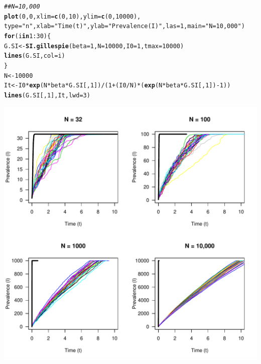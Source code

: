 \documentclass[12pt]{article}\usepackage[]{graphicx}\usepackage[]{color}
\makeatletter
\def\maxwidth{ %
  \ifdim\Gin@nat@width>\linewidth
    \linewidth
  \else
    \Gin@nat@width
  \fi
}
\newcommand{\hlnum}[1]{\textcolor[rgb]{0.686,0.059,0.569}{#1}}%
\newcommand{\hlstr}[1]{\textcolor[rgb]{0.192,0.494,0.8}{#1}}%
\newcommand{\hlcom}[1]{\textcolor[rgb]{0.678,0.584,0.686}{\textit{#1}}}%
\newcommand{\hlopt}[1]{\textcolor[rgb]{0,0,0}{#1}}%
\newcommand{\hlstd}[1]{\textcolor[rgb]{0.345,0.345,0.345}{#1}}%
\newcommand{\hlkwa}[1]{\textcolor[rgb]{0.161,0.373,0.58}{\textbf{#1}}}%
\newcommand{\hlkwb}[1]{\textcolor[rgb]{0.69,0.353,0.396}{#1}}%
\newcommand{\hlkwc}[1]{\textcolor[rgb]{0.333,0.667,0.333}{#1}}%
\newcommand{\hlkwd}[1]{\textcolor[rgb]{0.737,0.353,0.396}{\textbf{#1}}}%
\newenvironment{kframe}{%
 \def\at@end@of@kframe{}%
 \ifinner\ifhmode%
  \def\at@end@of@kframe{\end{minipage}}%
  \begin{minipage}{\columnwidth}%
 \fi\fi%
 \def\FrameCommand##1{\hskip\@totalleftmargin \hskip-\fboxsep
 \colorbox{shadecolor}{##1}\hskip-\fboxsep
     \hskip-\linewidth \hskip-\@totalleftmargin \hskip\columnwidth}%
 \MakeFramed {\advance\hsize-\width
   \@totalleftmargin\z@ \linewidth\hsize
   \@setminipage}}%
 {\par\unskip\endMakeFramed%
 \at@end@of@kframe}
\newenvironment{knitrout}{}{} %
\makeatother
\begin{document}
\begin{enumerate}[(a)]
\begin{knitrout}
\begin{kframe}
\begin{alltt}
\hlcom{## N=10,000}
\hlkwd{plot}\hlstd{(}\hlnum{0}\hlstd{,}\hlnum{0}\hlstd{,}\hlkwc{xlim}\hlstd{=}\hlkwd{c}\hlstd{(}\hlnum{0}\hlstd{,}\hlnum{10}\hlstd{),}\hlkwc{ylim}\hlstd{=}\hlkwd{c}\hlstd{(}\hlnum{0}\hlstd{,}\hlnum{10000}\hlstd{),}
     \hlkwc{type}\hlstd{=}\hlstr{"n"}\hlstd{,}\hlkwc{xlab}\hlstd{=}\hlstr{"Time (t)"}\hlstd{,}\hlkwc{ylab}\hlstd{=}\hlstr{"Prevalence (I)"}\hlstd{,}\hlkwc{las}\hlstd{=}\hlnum{1}\hlstd{,} \hlkwc{main} \hlstd{=} \hlstr{"N = 10,000"}\hlstd{)}
\hlkwa{for}\hlstd{(i} \hlkwa{in} \hlnum{1}\hlopt{:}\hlnum{30}\hlstd{)\{}
  \hlstd{G.SI} \hlkwb{<-} \hlkwd{SI.gillespie}\hlstd{(}\hlkwc{beta}\hlstd{=}\hlnum{1}\hlstd{,} \hlkwc{N}\hlstd{=}\hlnum{10000}\hlstd{,} \hlkwc{I0}\hlstd{=}\hlnum{1}\hlstd{,} \hlkwc{tmax}\hlstd{=}\hlnum{10000}\hlstd{)}
  \hlkwd{lines}\hlstd{(G.SI,} \hlkwc{col}\hlstd{=i)}
\hlstd{\}}
\hlstd{N} \hlkwb{<-} \hlnum{10000}
\hlstd{It} \hlkwb{<-} \hlstd{I0}\hlopt{*}\hlkwd{exp}\hlstd{(N}\hlopt{*}\hlstd{beta}\hlopt{*}\hlstd{G.SI[,}\hlnum{1}\hlstd{])}\hlopt{/}\hlstd{(}\hlnum{1}\hlopt{+}\hlstd{(I0}\hlopt{/}\hlstd{N)}\hlopt{*}\hlstd{(}\hlkwd{exp}\hlstd{(N}\hlopt{*}\hlstd{beta}\hlopt{*}\hlstd{G.SI[,}\hlnum{1}\hlstd{])}\hlopt{-}\hlnum{1}\hlstd{))}
\hlkwd{lines}\hlstd{(G.SI[,}\hlnum{1}\hlstd{],It,}\hlkwc{lwd}\hlstd{=}\hlnum{3}\hlstd{)}
\end{alltt}
\end{kframe}
\includegraphics[width=\maxwidth]{figure/unnamed-chunk-6-1} 

\end{knitrout}


\end{enumerate}
\end{document}
